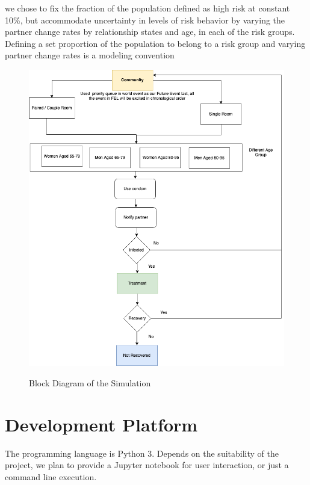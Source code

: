 \documentclass{article}
\begin{document}
\begin{normalsize}
   	we chose to fix the fraction of the population defined as high risk at constant 10\%, but accommodate uncertainty in levels of risk behavior by varying the partner change rates by relationship states and age, in each of the risk groups. Defining a set proportion of the population to belong to a risk group and varying partner change rates is a modeling convention

    

	

\begin{figure}[H]
\caption{Block Diagram of  the Simulation}
\centering
\includegraphics[width=1\textwidth]{BlockDiagram.png}
\label{fig:blockDiagram}
\end{figure}


    \section{Development Platform}
    The programming language is Python $3$. Depends on the suitability of the project, we plan to provide a Jupyter notebook for user interaction, or just a command line execution.
    

\end{normalsize}
\end{document}

